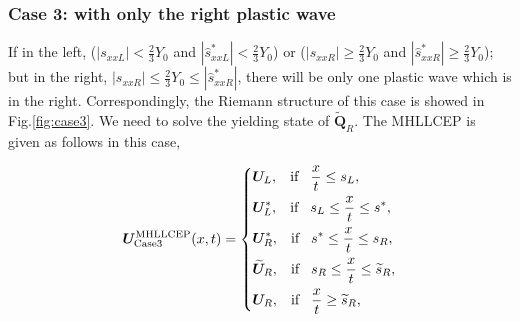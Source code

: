 \documentclass{article}
\numberwithin{equation}{section}
\numberwithin{table}{section}
\begin{document}
\subsubsection {Case 3: with only the right plastic wave}\label{sec:case3}
 If in the left, ($|s_{xxL}|<\frac{2}{3}Y_0$ and $|\hat{s}_{xxL}^*| < \frac{2}{3}Y_0$) or ($|s_{xxR}|\geq \frac{2}{3}Y_0$ and $|\hat{s}_{xxR}^*| \geq \frac{2}{3}Y_0$); but in the right, $|s_{xxR}| \le \frac{2}{3}Y_0 \le  |\hat{s}_{xxR}^*|$, there will be only one plastic wave which is in the right. Correspondingly, the Riemann structure of this case is showed in Fig.\ref{fig:case3}. We need to solve the yielding state of $\widetilde{\bm{Q}}_R$. The MHLLCEP is given as follows in this case,


 \begin{equation}\label{eq:HLLCEP3}
   \bm{U}^{\text{MHLLCEP}}_{\text{Case3}}(x,t) = \left\{ \begin{aligned}
		& \bm{U}_L, \hspace{0.3cm} \text{if} \hspace{0.3cm} \frac{x}{t}\le s_L, \\
		& \bm{U}_L^*, \hspace{0.3cm} \text{if} \hspace{0.3cm} s_L \le \frac{x}{t} \le s^*, \\
		& \bm{U}_R^*, \hspace{0.3cm} \text{if} \hspace{0.3cm} s^*\le \frac{x}{t} \le s_R, \\
		& \widetilde{\bm{U}}_R, \hspace{0.3cm} \text{if} \hspace{0.3cm} s_R \le \frac{x}{t} \le \widetilde{s}_R,\\
		& \bm{U}_R, \hspace{0.3cm} \text{if} \hspace{0.3cm} \frac{x}{t}\ge \widetilde{s}_R, \\
	  \end{aligned}
	\right.
  \end{equation}
\end{document}
